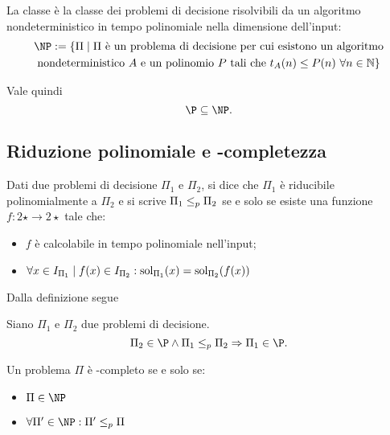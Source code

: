 \begin{defin}[\NP]
	La classe \NP è la classe dei problemi di decisione risolvibili da un algoritmo nondeterministico in tempo polinomiale nella dimensione dell'input:
	\begin{gather*}
		\NP :=\{\Pi\mid \Pi\text{ è un problema di decisione per cui esistono un algoritmo}\\
		\text{nondeterministico $A$ e un polinomio $P$ tali che }t_A(n)\leq P(n)~\forall n\in\N\}
	\end{gather*}
\end{defin}

Vale quindi
\begin{equation*}
	\P\subseteq\NP\text.
\end{equation*}


\subsection{Riduzione polinomiale e \texorpdfstring{\NP}{NP}-completezza}
\begin{defin}
	Dati due problemi di decisione $\Pi_1$ e $\Pi_2$, si dice che $\Pi_1$ è riducibile polinomialmente a $\Pi_2$ e si scrive $\Pi_1\leq_p\Pi_2$ se e solo se esiste una funzione $f:2\star\to2\star$ tale che:
	\begin{itemize}
		\item $f$ è calcolabile in tempo polinomiale nell'input;
		\item $\forall x\in I_{\Pi_1}\mid f(x)\in I_{\Pi_2}: \mathrm{sol}_{\Pi_1}(x)=\mathrm{sol}_{\Pi_2}(f(x))$
	\end{itemize}
\end{defin}

Dalla definizione segue
\begin{theorem}\label{lem:poli_red}
	Siano $\Pi_1$ e $\Pi_2$ due problemi di decisione.
	\begin{equation*}
		\Pi_2\in\P\land\Pi_1\prid\Pi_2 \impl \Pi_1\in\P\text.
	\end{equation*}
\end{theorem}

\begin{defin}
	Un problema $\Pi$ è \NP-completo se e solo se:
	\begin{itemize}
		\item $\Pi\in\NP$
		\item $\forall\Pi'\in\NP: \Pi'\prid \Pi$
	\end{itemize}
\end{defin}

